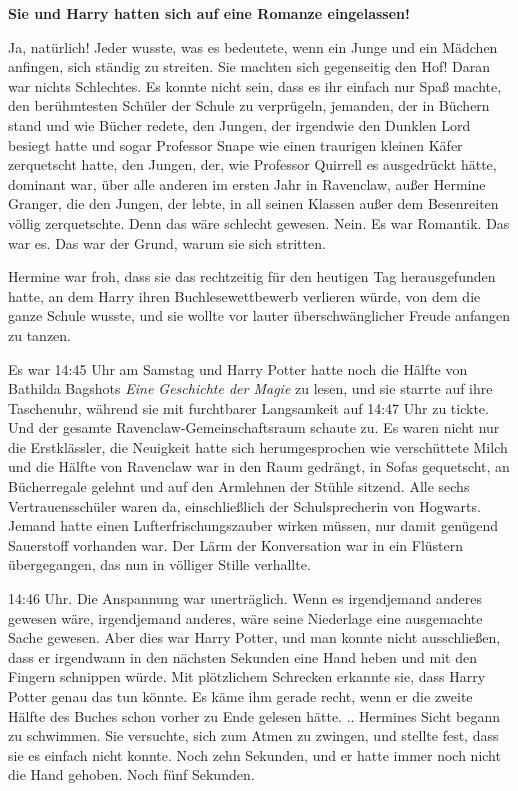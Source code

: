 \textbf{Sie und Harry hatten sich auf eine Romanze eingelassen!}

Ja, natürlich! Jeder wusste, was es bedeutete, wenn ein Junge und ein Mädchen
anfingen, sich ständig zu streiten. Sie machten sich gegenseitig den Hof! Daran
war nichts Schlechtes. Es konnte nicht sein, dass es ihr einfach nur Spaß
machte, den berühmtesten Schüler der Schule zu verprügeln, jemanden, der in
Büchern stand und wie Bücher redete, den Jungen, der irgendwie den Dunklen Lord
besiegt hatte und sogar Professor Snape wie einen traurigen kleinen Käfer
zerquetscht hatte, den Jungen, der, wie Professor Quirrell es ausgedrückt hätte,
dominant war, über alle anderen im ersten Jahr in Ravenclaw, außer Hermine
Granger, die den Jungen, der lebte, in all seinen Klassen außer dem Besenreiten
völlig zerquetschte. Denn das wäre schlecht gewesen. Nein. Es war Romantik. Das
war es. Das war der Grund, warum sie sich stritten.

Hermine war froh, dass sie das rechtzeitig für den heutigen Tag herausgefunden
hatte, an dem Harry ihren Buchlesewettbewerb verlieren würde, von dem die ganze
Schule wusste, und sie wollte vor lauter überschwänglicher Freude anfangen zu
tanzen.

Es war 14:45 Uhr am Samstag und Harry Potter hatte noch die Hälfte von Bathilda
Bagshots \emph{Eine Geschichte der Magie} zu lesen, und sie starrte auf ihre
Taschenuhr, während sie mit furchtbarer Langsamkeit auf 14:47 Uhr zu tickte. Und
der gesamte Ravenclaw-Gemeinschaftsraum schaute zu. Es waren nicht nur die
Erstklässler, die Neuigkeit hatte sich herumgesprochen wie verschüttete Milch
und die Hälfte von Ravenclaw war in den Raum gedrängt, in Sofas gequetscht, an
Bücherregale gelehnt und auf den Armlehnen der Stühle sitzend. Alle sechs
Vertrauensschüler waren da, einschließlich der Schulsprecherin von Hogwarts.
Jemand hatte einen Lufterfrischungszauber wirken müssen, nur damit genügend
Sauerstoff vorhanden war. Der Lärm der Konversation war in ein Flüstern
übergegangen, das nun in völliger Stille verhallte.

14:46 Uhr. Die Anspannung war unerträglich. Wenn es irgendjemand anderes gewesen
wäre, irgendjemand anderes, wäre seine Niederlage eine ausgemachte Sache
gewesen. Aber dies war Harry Potter, und man konnte nicht ausschließen, dass er
irgendwann in den nächsten Sekunden eine Hand heben und mit den Fingern
schnippen würde. Mit plötzlichem Schrecken erkannte sie, dass Harry Potter genau
das tun könnte. Es käme ihm gerade recht, wenn er die zweite Hälfte des Buches
schon vorher zu Ende gelesen hätte. .. Hermines Sicht begann zu schwimmen. Sie
versuchte, sich zum Atmen zu zwingen, und stellte fest, dass sie es einfach
nicht konnte. Noch zehn Sekunden, und er hatte immer noch nicht die Hand
gehoben. Noch fünf Sekunden.

